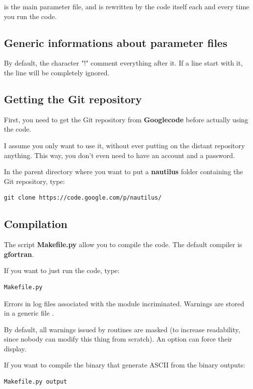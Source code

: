 \documentclass[english,a4paper,twoside]{article}
\begin{document}
 is the main parameter file, and is rewritten by the code itself each and every time you run the code. 

\subsection{Generic informations about parameter files}\label{sec:files_generic_info}
By default, the character "!" comment everything after it. If a line start with it, the line will be completely ignored.

\subsection{Getting the Git repository}
First, you need to get the Git repository from \textbf{Googlecode} before actually using the code. 

I assume you only want to use it, without ever putting on the distant repository anything. This way, you don't even need to have an account and a password. 

In the parent directory where you want to put a \textbf{nautilus} folder containing the Git repository, type:
\begin{verbatim}
git clone https://code.google.com/p/nautilus/
\end{verbatim}

\subsection{Compilation}
The script \textbf{Makefile.py} allow you to compile the code. The default compiler is \textbf{gfortran}. 

If you want to just run the code, type:
\begin{verbatim}
Makefile.py
\end{verbatim}

\begin{remarque}
Errors in log files associated with the module incriminated. Warnings are stored in a generic file .
\end{remarque}

\begin{attention}
By default, all warnings issued by  routines are masked (to increase readability, since nobody can modify this thing from scratch). An option can force their display.
\end{attention}

If you want to compile the binary  that generate ASCII from the binary outputs:
\begin{verbatim}
Makefile.py output
\end{verbatim}
\end{document}
